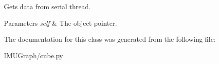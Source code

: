 Gets data from serial thread. 


\begin{DoxyParams}{Parameters}
{\em self} & The object pointer. \\
\hline
\end{DoxyParams}


The documentation for this class was generated from the following file\-:\begin{DoxyCompactItemize}
\item 
I\-M\-U\-Graph/cube.\-py\end{DoxyCompactItemize}

